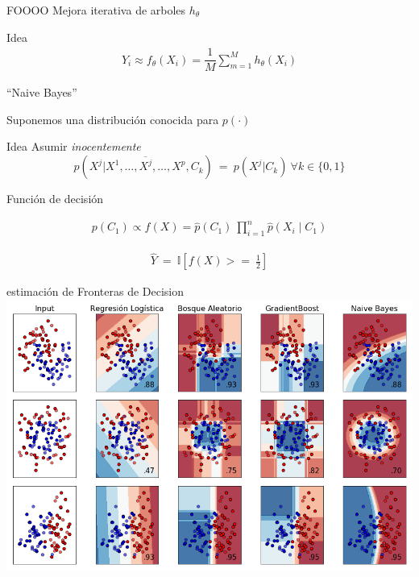 \documentclass[xcolor=x11names]{beamer}
\begin{document}
\begin{frame}{FOOOO}
	Mejora iterativa de arboles $h_{\theta}$

	\begin{block}{Idea} 
		\begin{align*}
			Y_i \approx f_{\theta}(X_i) = \dfrac{1}{M}\sum_{m=1}^M h_{\theta}(X_i) 
		\end{align*}

	\end{block}

\end{frame}




\begin{frame}{``Naive Bayes''}

Suponemos una distribución conocida para $p(\cdot)$
	\begin{block}{Idea}
		Asumir \textit{inocentemente}
		$$p(X^j |X^1,\ldots,\overline{X^j},\ldots,X^p, C_k) \ = \ p(X^j | C_k) \ \forall k \in \{0,1\}$$
	\end{block}

	\begin{block}{Función de decisión }

		\begin{align*}
			p(C_1) \propto f(X) = \hat{p}(C_{1}) \  \prod_{i=1}^{n} \hat{p}(X_{i}\mid C_{1})
		\end{align*}

		\begin{align*}
			\hat{Y} \ = \ \mathbb{I}\left[  f(X)  >= \ \frac{1}{2} \right]
		\end{align*}

	\end{block}
\end{frame}


\begin{frame}{estimación de Fronteras de Decision}
		\includegraphics[width = 0.9 \paperwidth, height = 0.7 \paperheight, 
										trim = 0.2 0.2 0.2 0.2cm, left, clip = true]{slides/plot_classifier_comparison.png}
\end{frame}
\end{document}
